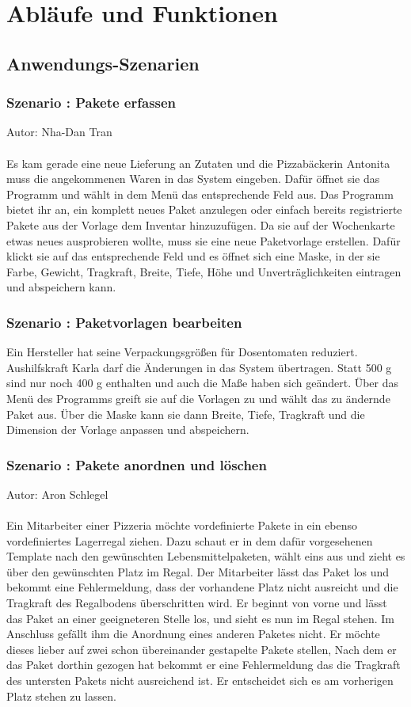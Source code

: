 \section{Abläufe und Funktionen}
\label{subsec:szenarien}
\subsection{Anwendungs-Szenarien}
\setcounter{szn}{1}
\subsubsection*{Szenario \theszn: Pakete erfassen}
Autor: Nha-Dan Tran\\~\\
Es kam gerade eine neue Lieferung an Zutaten und die Pizzabäckerin Antonita muss die angekommenen Waren in das System eingeben. Dafür öffnet sie das Programm und wählt in dem Menü das entsprechende Feld aus. Das Programm bietet ihr an, ein komplett neues Paket anzulegen oder einfach bereits registrierte Pakete aus der Vorlage dem Inventar hinzuzufügen. Da sie auf der Wochenkarte etwas neues ausprobieren wollte, muss sie eine neue Paketvorlage erstellen. Dafür klickt sie auf das entsprechende Feld und es öffnet sich eine Maske, in der sie Farbe, Gewicht, Tragkraft, Breite, Tiefe, Höhe und Unverträglichkeiten eintragen und abspeichern kann.
\subsubsection*{Szenario \theszn: Paketvorlagen bearbeiten}
Ein Hersteller hat seine Verpackungsgrößen für Dosentomaten reduziert. Aushilfskraft Karla darf die Änderungen in das System übertragen. Statt 500 g sind nur noch 400 g enthalten und auch die Maße haben sich geändert. Über das Menü des Programms greift sie auf die Vorlagen zu und wählt das zu ändernde Paket aus. Über die Maske kann sie dann Breite, Tiefe, Tragkraft und die Dimension der Vorlage anpassen und abspeichern.
\subsubsection*{Szenario \theszn: Pakete anordnen und löschen}
Autor: Aron Schlegel\\~\\
Ein Mitarbeiter einer Pizzeria möchte vordefinierte Pakete in ein ebenso vordefiniertes Lagerregal ziehen. Dazu schaut er in dem dafür vorgesehenen Template nach den gewünschten Lebensmittelpaketen, wählt eins aus und zieht es über den gewünschten Platz im Regal. Der Mitarbeiter lässt das Paket los und bekommt eine Fehlermeldung, dass der vorhandene Platz nicht ausreicht und die Tragkraft des Regalbodens überschritten wird. Er beginnt von vorne und lässt das Paket an einer geeigneteren Stelle los, und sieht es nun im Regal stehen. Im Anschluss gefällt ihm die Anordnung eines anderen Paketes nicht. Er möchte dieses lieber auf zwei schon übereinander gestapelte Pakete stellen, Nach dem er das Paket dorthin gezogen hat bekommt er eine Fehlermeldung das die Tragkraft des untersten Pakets nicht ausreichend ist. Er entscheidet sich es am vorherigen Platz stehen zu lassen. 
